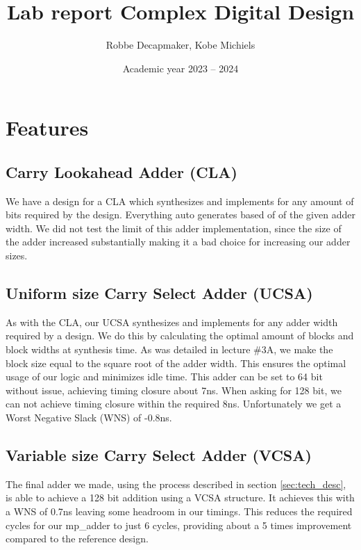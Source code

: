 \documentclass[a4paper,kul]{kulakarticle} %
\date{Academic year 2023 -- 2024}
\title{Lab report Complex Digital Design}
\author{Robbe Decapmaker, Kobe Michiels}
\begin{document}
\maketitle
\section{Features}


\subsection{Carry Lookahead Adder (CLA)}

We have a design for a CLA which synthesizes and implements for any amount of bits required by the design. Everything auto generates based of of the given adder width. We did not test the limit of this adder implementation, since the size of the adder increased substantially making it a bad choice for increasing our adder sizes. 

\subsection{Uniform size Carry Select Adder (UCSA)}

As with the CLA, our UCSA synthesizes and implements for any adder width required by a design. We do this by calculating the optimal amount of blocks and block widths at synthesis time. As was detailed in lecture \#3A, we make the block size equal to the square root of the adder width. This ensures the optimal usage of our logic and minimizes idle time. This adder can be set to 64 bit without issue, achieving timing closure about 7ns. When asking for 128 bit, we can not achieve timing closure within the required 8ns. Unfortunately we get a Worst Negative Slack (WNS) of -0.8ns. 

\subsection{Variable size Carry Select Adder (VCSA)}

The final adder we made, using the process described in section \ref{sec:tech_desc}, is able to achieve a 128 bit addition using a VCSA structure. It achieves this with a WNS of 0.7ns leaving some headroom in our timings. This reduces the required cycles for our mp\_adder to just 6 cycles, providing about a 5 times improvement compared to the reference design. 
\end{document}
